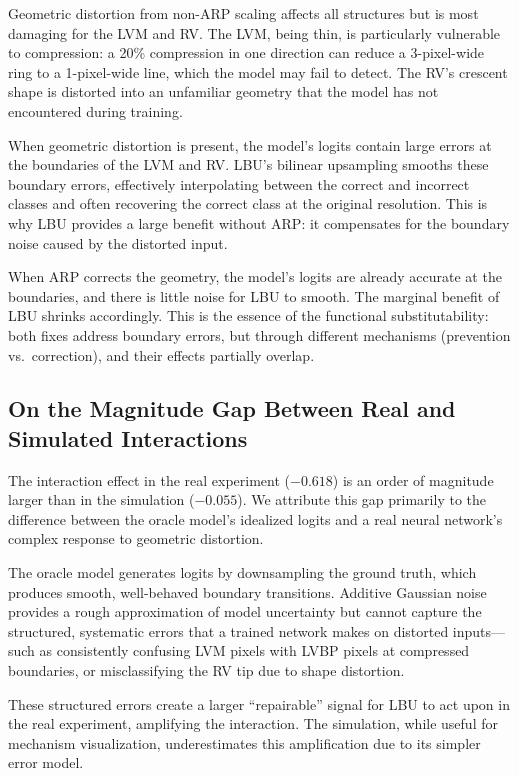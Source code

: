 \documentclass[10pt,twocolumn]{article}
\begin{document}
Geometric distortion from non-ARP scaling affects all structures but is most damaging for the LVM and RV.
The LVM, being thin, is particularly vulnerable to compression: a 20\% compression in one direction can reduce a 3-pixel-wide ring to a 1-pixel-wide line, which the model may fail to detect.
The RV's crescent shape is distorted into an unfamiliar geometry that the model has not encountered during training.

When geometric distortion is present, the model's logits contain large errors at the boundaries of the LVM and RV.
LBU's bilinear upsampling smooths these boundary errors, effectively interpolating between the correct and incorrect classes and often recovering the correct class at the original resolution.
This is why LBU provides a large benefit without ARP: it compensates for the boundary noise caused by the distorted input.

When ARP corrects the geometry, the model's logits are already accurate at the boundaries, and there is little noise for LBU to smooth.
The marginal benefit of LBU shrinks accordingly.
This is the essence of the functional substitutability: both fixes address boundary errors, but through different mechanisms (prevention vs.\ correction), and their effects partially overlap.

\subsection{On the Magnitude Gap Between Real and Simulated Interactions}

The interaction effect in the real experiment ($-0.618$) is an order of magnitude larger than in the simulation ($-0.055$).
We attribute this gap primarily to the difference between the oracle model's idealized logits and a real neural network's complex response to geometric distortion.

The oracle model generates logits by downsampling the ground truth, which produces smooth, well-behaved boundary transitions.
Additive Gaussian noise provides a rough approximation of model uncertainty but cannot capture the structured, systematic errors that a trained network makes on distorted inputs---such as consistently confusing LVM pixels with LVBP pixels at compressed boundaries, or misclassifying the RV tip due to shape distortion.

These structured errors create a larger ``repairable'' signal for LBU to act upon in the real experiment, amplifying the interaction.
The simulation, while useful for mechanism visualization, underestimates this amplification due to its simpler error model.
\end{document}
